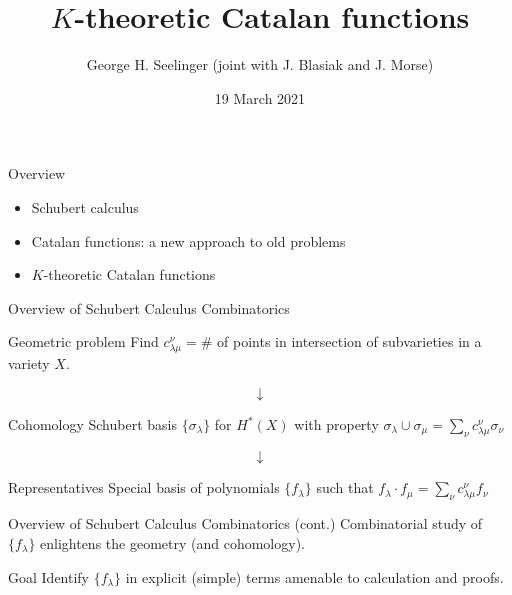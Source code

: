 \documentclass{beamer}
\title[\(K\)-theory Catalans]{\(K\)-theoretic Catalan functions} %
\author[George H. Seelinger]{George H. Seelinger (joint with
  J. Blasiak and J. Morse)} %
\institute[UVA] %
{
\textit{ghs9ae@virginia.edu}\\ %
  {\tt arXiv:2010.01759}\\
  \medskip
LACIM at UQAM\\ %
}
\date{19 March 2021} %
\DeclareMathOperator{\Gr}{Gr}
\newcommand{\cupprod}{\cup}
\begin{document}
\begin{frame}
\titlepage %
\end{frame}
\begin{frame}{Overview}
  \begin{itemize}
  \item Schubert calculus
  \item Catalan functions: a new approach to old problems
  \item \(K\)-theoretic Catalan functions
  \end{itemize}
\end{frame}
\begin{frame}{Overview of Schubert Calculus Combinatorics}
  \begin{block}{Geometric problem}
    Find \(c_{\lambda \mu}^\nu = \#\) of points in
    intersection of subvarieties in a variety \(X\). \pause
  \end{block}
  \[
    \downarrow
  \]
  \begin{block}{Cohomology}
    Schubert basis \(\{\sigma_\lambda\}\) for \(H^*(X)\) with property \(\sigma_\lambda \cupprod \sigma_\mu = \sum_\nu c_{\lambda \mu}^\nu \sigma_\nu\) \pause 
\end{block}
\[
  \downarrow
\]
\begin{block}{Representatives}
  Special basis of polynomials \(\{f_\lambda\}\) such that \(f_\lambda \cdot f_\mu = \sum_\nu c_{\lambda \mu}^\nu f_\nu\)
\end{block}
\end{frame}
\begin{frame}{Overview of Schubert Calculus Combinatorics (cont.)}
  Combinatorial study of \(\{f_\lambda\}\) enlightens the geometry
  (and cohomology). %
  \begin{alertblock}{Goal}
    Identify \(\{f_\lambda\}\) in explicit (simple) terms amenable to
    calculation and proofs.
  \end{alertblock}
\end{frame}
\end{document}

